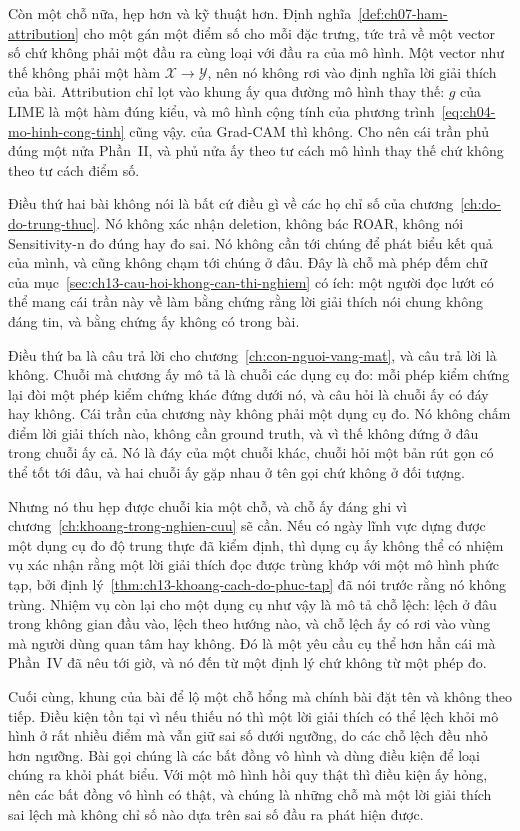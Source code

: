 Còn một chỗ nữa, hẹp hơn và kỹ thuật hơn. Định
nghĩa~\ref{def:ch07-ham-attribution} cho một  gán một điểm số cho
mỗi đặc trưng, tức trả về một vector số chứ không phải một đầu ra cùng loại với
đầu ra của mô hình. Một vector như thế không phải một hàm
$\mathcal{X} \to \mathcal{Y}$, nên nó không rơi vào định nghĩa lời giải thích của
bài. Attribution chỉ lọt vào khung ấy qua đường mô hình thay thế: $g$ của LIME
là một hàm đúng kiểu, và mô hình cộng tính của
phương trình~\ref{eq:ch04-mo-hinh-cong-tinh} cũng vậy.  của Grad-CAM thì không. Cho nên cái trần phủ đúng một nửa Phần~II, và phủ nửa ấy theo tư cách
mô hình thay thế chứ không theo tư cách điểm số.

Điều thứ hai bài không nói là bất cứ điều gì về các họ chỉ số của
chương~\ref{ch:do-do-trung-thuc}. Nó không xác nhận deletion, không bác ROAR,
không nói Sensitivity-n đo đúng hay đo sai. Nó không cần tới chúng để phát biểu
kết quả của mình, và cũng không chạm tới chúng ở đâu. Đây là chỗ mà phép đếm chữ
của mục~\ref{sec:ch13-cau-hoi-khong-can-thi-nghiem} có ích: một người đọc lướt
có thể mang cái trần này về làm bằng chứng rằng lời giải thích nói chung không
đáng tin, và bằng chứng ấy không có trong bài.

%
Điều thứ ba là câu trả lời cho
chương~\ref{ch:con-nguoi-vang-mat}, và câu trả lời là không. Chuỗi mà chương ấy
mô tả là chuỗi các dụng cụ đo: mỗi phép kiểm chứng lại đòi một phép kiểm chứng
khác đứng dưới nó, và câu hỏi là chuỗi ấy có đáy hay không. Cái trần của chương
này không phải một dụng cụ đo. Nó không chấm điểm lời giải thích nào, không cần
ground truth, và vì thế không đứng ở đâu trong chuỗi ấy cả. Nó là đáy của một
chuỗi khác, chuỗi hỏi một bản rút gọn có thể tốt tới đâu, và hai chuỗi ấy gặp
nhau ở tên gọi chứ không ở đối tượng.

Nhưng nó thu hẹp được chuỗi kia một chỗ, và chỗ ấy đáng ghi vì
chương~\ref{ch:khoang-trong-nghien-cuu} sẽ cần. Nếu có ngày lĩnh vực dựng được
một dụng cụ đo độ trung thực đã kiểm định, thì dụng cụ ấy không thể có nhiệm vụ
xác nhận rằng một lời giải thích đọc được trùng khớp với một mô hình phức tạp,
bởi định lý~\ref{thm:ch13-khoang-cach-do-phuc-tap} đã nói trước rằng nó không
trùng. Nhiệm vụ còn lại cho một dụng cụ như vậy là mô tả chỗ lệch: lệch ở đâu
trong không gian đầu vào, lệch theo hướng nào, và chỗ lệch ấy có rơi vào vùng mà
người dùng quan tâm hay không. Đó là một yêu cầu cụ thể hơn hẳn cái mà Phần~IV
đã nêu tới giờ, và nó đến từ một định lý chứ không từ một phép đo.

Cuối cùng, khung của bài để lộ một chỗ hổng mà chính bài đặt tên và không theo
tiếp. Điều kiện  tồn tại vì nếu thiếu nó thì
một lời giải thích có
thể lệch khỏi mô hình ở rất nhiều điểm mà vẫn giữ sai số dưới ngưỡng, do các chỗ
lệch đều nhỏ hơn ngưỡng. Bài gọi chúng là các bất đồng vô hình và dùng điều kiện
để loại chúng ra khỏi phát biểu. Với một mô hình hồi quy thật thì điều kiện ấy
hỏng, nên các bất đồng vô hình có thật, và chúng là những chỗ mà một lời giải
thích sai lệch mà không chỉ số nào dựa trên sai số đầu ra phát hiện được.

%
